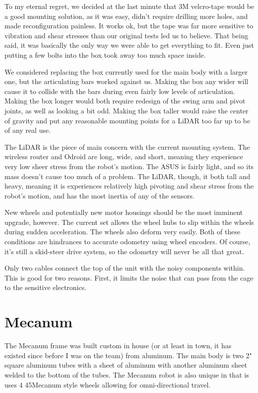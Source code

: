 To my eternal regret, we decided at the last minute that 3M velcro-tape would be a good mounting solution, as it was easy, didn't require drilling more holes, and made reconfiguration painless. It works ok, but the tape was far more sensitive to vibration and shear stresses than our original tests led us to believe. That being said, it was basically the only way we were able to get everything to fit. Even just putting a few bolts into the box took away too much space inside.

We considered replacing the box currently used for the main body with a larger one, but the articulating bars worked against us. Making the box any wider will cause it to collide with the bars during even fairly low levels of articulation. Making the box longer would both require redesign of the swing arm and pivot joints, as well as looking a bit odd. Making the box taller would raise the center of gravity and put any reasonable mounting points for a LiDAR too far up to be of any real use.

The LiDAR is the piece of main concern with the current mounting system. The wireless router and Odroid are long, wide, and short, meaning they experience very low sheer stress from the robot's motion. The ASUS is fairly light, and so its mass doesn't cause too much of a problem. The LiDAR, though, it both tall and heavy, meaning it is experiences relatively high pivoting and shear stress from the robot's motion, and has the most inertia of any of the sensors.

New wheels and potentially new motor housings should be the most imminent upgrade, however. The current set allows the wheel hubs to slip within the wheels during sudden acceleration. The wheels also deform very easily. Both of these conditions are hindrances to accurate odometry using wheel encoders. Of course, it's still a skid-steer drive system, so the odometry will never be all that great.

Only two cables connect the top of the unit with the noisy components within. This is good for two reasons. First, it limits the noise that can pass from the cage to the sensitive electronics.

\section{Mecanum}

The Mecanum frame was built custom in house (or at least in town, it has existed since before I was on the team) from aluminum. The main body is two 2" square aluminum tubes with a sheet of aluminum with another aluminum sheet welded to the bottom of the tubes. The Mecanum robot is also unique in that is uses 4 45\degree  Mecanum style wheels allowing for omni-directional travel.

